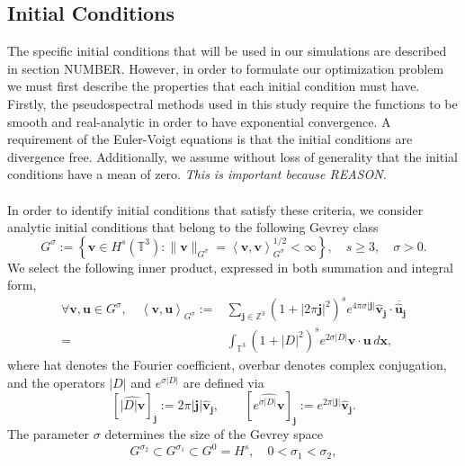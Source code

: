 \documentclass[12pt]{article}
\newcommand{\la}{\left\langle}
\newcommand{\ra}{\right\rangle}
\newcommand{\lb}{\left\lbrace}
\newcommand{\rb}{\right\rbrace}
\def\u{\boldsymbol u}
\def\v{\boldsymbol v}
\def\x{\boldsymbol x}
\def\j{\boldsymbol j}
\def\TT{\mathbb{T}}
\def\ZZ{\mathbb{Z}}
\numberwithin{equation}{section}
\begin{document}
\subsection{Initial Conditions}
The specific initial conditions that will be used in our simulations are described in section NUMBER. However, in order to formulate our optimization problem we must first describe the properties that each initial condition must have. Firstly, the pseudospectral methods used in this study require the functions to be smooth and real-analytic in order to have exponential convergence. A requirement of the Euler-Voigt equations is that the initial conditions are divergence free. Additionally, we assume without loss of generality that the initial conditions have a mean of zero. \textit{This is important because REASON.}
\\~\\
In order to identify initial conditions that satisfy these criteria, we consider analytic initial conditions that belong to the following Gevrey class
\begin{equation}\label{eq:Gevrey:Class}
G^\sigma := \lb \v\in H^s(\TT^3) : \|\v\|_{G^\sigma} = \la \v,\v\ra_{G^\sigma}^{1/2}<\infty \rb, \quad s\geq 3, \quad \sigma > 0.
\end{equation}
We select the following inner product, expressed in both summation and integral form,
\begin{subequations}\label{eq:Gevrey:def}
\begin{align}
\forall \v,\u \in G^\sigma, \quad \la \v,\u \ra_{G^\sigma} :=& \sum_{\j\in \ZZ^3} (1+|2\pi \j|^2)^se^{4\pi\sigma|\j|}\hat{\v}_{\j}\cdot \overline{\hat{\u}}_{\j} \\
=& \int_{\TT^3}(1+|D|^2)^se^{2\sigma |D|}\v\cdot \u \, d\x,
\end{align}
\end{subequations}
where hat denotes the Fourier coefficient, overbar denotes complex conjugation, and the operators $|D|$ and $e^{\sigma|D|}$ are defined via
\begin{equation}\label{eq:D}
\left[ \widehat{|D|\boldsymbol v} \right]_{\boldsymbol j} := 2\pi|\boldsymbol j|\boldsymbol{\hat{v}_j}, \qquad \left[ \widehat{e^{\sigma |D|}\boldsymbol v} \right]_{\boldsymbol j} := e^{2\pi|\boldsymbol j|}\boldsymbol{\hat{v}_j}.
\end{equation}
The parameter $\sigma$ determines the size of the Gevrey space
\begin{equation}\label{eq:Gevrey:size}
G^{\sigma_2} \subset G^{\sigma_1} \subset G^0 = H^s, \quad 0 < \sigma_1 < \sigma_2,
\end{equation}
\end{document}
